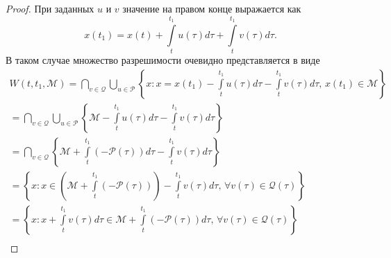 \begin{proof}
    При заданных \( u \) и \( v \) значение на правом конце выражается как 
    \[
        x(t_1) = x(t) + \int\limits_t^{t_1}u(\tau)d\tau + \int\limits_t^{t_1}
        v(\tau)d\tau.
    \]
    В таком случае множество разрешимости очевидно представляется в виде
    \begin{multline*}
        W(t, t_1, \mathcal{M}) = \bigcap\limits_{v \in \mathcal{Q}} 
         \bigcup\limits_{u \in \mathcal{P}} \left\{ x : x = x(t_1)
         -\int\limits_t^{t_1}u(\tau) d\tau - \int\limits_t^{t_1} v(\tau)
         d\tau, \, x(t_1) \in \mathcal{M} \right\} \\
        = \bigcap\limits_{v \in \mathcal{Q}} \bigcup\limits_{u \in 
         \mathcal{P}} \left\{ \mathcal{M} - \int\limits_t^{t_1} u(\tau) d\tau
         - \int\limits_t^{t_1} v(\tau) d\tau \right\} \\
        = \bigcap\limits_{v \in \mathcal{Q}} \left\{ \mathcal{M} +
         \int\limits_t^{t_1}(-\mathcal{P}(\tau)) d\tau - \int\limits_t^{t_1}
         v(\tau) d\tau \right\} \\
        = \left\{ x : x \in \left( \mathcal{M} + \int\limits_t^{t_1}(- \mathcal{P}
         (\tau)) \right)  - \int\limits_t^{t_1} v(\tau) d\tau, \, \forall v(\tau)
         \in \mathcal{Q}(\tau) \right\} \\
        = \left\{ x : x + \int\limits_t^{t_1} v(\tau) d\tau \in \mathcal{M} + 
         \int\limits_t^{t_1}(- \mathcal{P}(\tau)) d\tau, \, \forall v(\tau) \in
         \mathcal{Q}(\tau) \right\} \\
    \end{multline*}
\end{proof}

 


